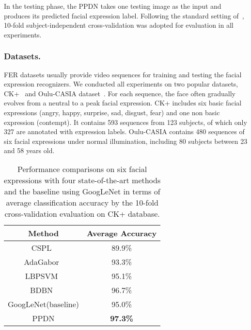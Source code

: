 \documentclass[runningheads]{llncs}
\begin{document}
In the testing phase, the PPDN takes one testing image as the input 
and produces its predicted facial expression label. Following the 
standard setting of~\cite{zhong2012learning,shan2009facial}, 10-fold 
subject-independent cross-validation was adopted for evaluation in all 
experiments. 

\subsubsection{Datasets.} FER datasets usually provide video sequences for 
training and testing the facial expression recognizers. We conducted all 
experiments on two popular datasets, CK+~\cite{lucey2010extended} and  
Oulu-CASIA dataset~\cite{zhao2011facial}. For each sequence, the face 
often gradually evolves from a neutral to a peak facial expression. 
CK+ includes six basic facial expressions (angry, happy, surprise, sad, 
disgust, fear) and one non basic expression (contempt).  It contains 
593 sequences from 123 subjects, of which only 327 are annotated with 
expression labels. Oulu-CASIA contains 480 sequences of six facial 
expressions under normal illumination, including 80 subjects between 23 
and 58 years old. 

\begin{table}[!tp]
	\begin{center}
		\caption{Performance comparisons on six facial expressions with four state-of-the-art methods and the baseline using GoogLeNet in terms of average classification accuracy by the 10-fold cross-validation evaluation on CK+ database.}
		\label{table:ckcom_image}
		\begin{tabular}{c|c}
			\hline\noalign{\smallskip}
			Method & Average Accuracy\\
			
			\hline
			
			CSPL~\cite{zhong2012learning}  & 89.9\% \\
			AdaGabor~\cite{bartlett2005recognizing}&  93.3\% \\
			LBPSVM~\cite{shan2009facial} &  95.1\%\\
			BDBN~\cite{liu2014facial}& 96.7\% \\
			GoogLeNet(baseline) & 95.0\% \\
			\hline
			PPDN& \textbf{97.3\%} \\
			\hline
		\end{tabular}
	\end{center}
\end{table}
\end{document}
